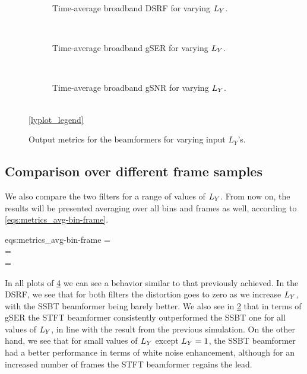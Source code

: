 \begin{figure}[!ht]
	\centering
	\begin{subfigure}{\textwidth}
			\centering
			
			\caption{Time-average broadband DSRF for varying $\Ly$.}
			\label{subfig:lineplot__DSRF__iSER_n15__Ly_var__err_0}
		\end{subfigure}\\[1em]
	\begin{subfigure}{\textwidth}
			\centering
			
			\caption{Time-average broadband gSER for varying $\Ly$.}
			\label{subfig:lineplot__gSER__iSER_n15__Ly_var__err_0}
		\end{subfigure}\\[1em]
	\begin{subfigure}{\textwidth}
			\centering
			
			\caption{Time-average broadband gSNR for varying $\Ly$.}
			\label{subfig:lineplot__gSNR__iSER_n15__Ly_var__err_0}
		\end{subfigure}\\[1em]
	\ref*{lyplot_legend}
	\caption{Output metrics for the beamformers for varying input $L_Y$'s.}
	\label{fig:lineplot__iSER_n15__Ly_var__err_0}
\end{figure}

\subsection{Comparison over different frame samples}
\label{subsec:sec4:comparison_different_Ly}

We also compare the two filters for a range of values of $\Ly$. From now on, the results will be presented averaging over all bins and frames as well, according to \cref{eqs:metrics_avg-bin-frame}.
\begin{subgather}{eqs:metrics_avg-bin-frame}
	\dsrf =  \\
	\gser =  \cdot {} \\
	\gsnr =  \cdot {}
\end{subgather}

In all plots of \cref{fig:lineplot__iSER_n15__Ly_var__err_0} we can see a behavior similar to that previously achieved. In the DSRF, we see that for both filters the distortion goes to zero as we increase $\Ly$, with the SSBT beamformer being barely better. We also see in \cref{subfig:lineplot__gSER__iSER_n15__Ly_var__err_0} that in terms of gSER the STFT beamformer consistently outperformed the SSBT one for all values of $\Ly$, in line with the result from the previous simulation. On the other hand, we see that for small values of $\Ly$ except $\Ly = 1$, the SSBT beamformer had a better performance in terms of white noise enhancement, although for an increased number of frames the STFT beamformer regains the lead.

